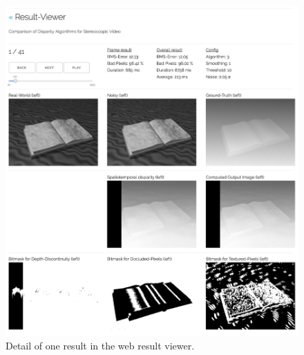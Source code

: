 \begin{figure}[p!]
  \centering
  \includegraphics[width=1.0\textwidth]{src/images/result-viewer-detail.png}
  \caption{Detail of one result in the web result viewer.}
  \label{fig:web-detail}
\end{figure}
